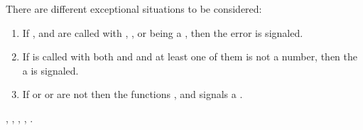 \documentclass[../Exponentials-Logarithms-Trigonometry.tex]{subfiles}
\begin{document}
\DExceptional{}

There are different exceptional situations to be considered:
\begin{enumerate}
  \item If ,  and  are called with
    , , or  being a
    , then the
     error is signaled.
  \item If  is called with both  and
     and at least one of them is not a  number,
    then the a  is signaled.
  \item If  or  or  are not \CL{}
     then the functions ,  and
     signals a .
\end{enumerate}

\DSeeAlso{}

\code{*}, \code{-}, , , .
\end{document}
